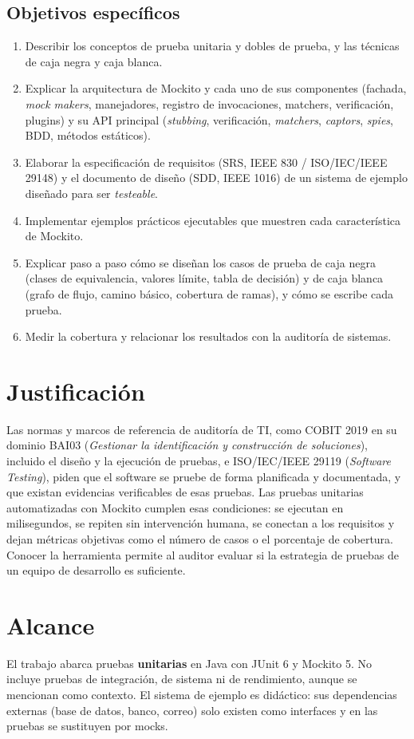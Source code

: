 \documentclass[11pt,a4paper,oneside]{report}
\begin{document}
\subsection{Objetivos específicos}
\begin{enumerate}
  \item Describir los conceptos de prueba unitaria y dobles de prueba, y las técnicas de caja negra y caja blanca.
  \item Explicar la arquitectura de Mockito y cada uno de sus componentes (fachada, \emph{mock makers}, manejadores, registro de invocaciones, matchers, verificación, plugins) y su API principal (\emph{stubbing}, verificación, \emph{matchers}, \emph{captors}, \emph{spies}, BDD, métodos estáticos).
  \item Elaborar la especificación de requisitos (SRS, IEEE 830 / ISO/IEC/IEEE 29148) y el documento de diseño (SDD, IEEE 1016) de un sistema de ejemplo diseñado para ser \emph{testeable}.
  \item Implementar ejemplos prácticos ejecutables que muestren cada característica de Mockito.
  \item Explicar paso a paso cómo se diseñan los casos de prueba de caja negra (clases de equivalencia, valores límite, tabla de decisión) y de caja blanca (grafo de flujo, camino básico, cobertura de ramas), y cómo se escribe cada prueba.
  \item Medir la cobertura y relacionar los resultados con la auditoría de sistemas.
\end{enumerate}

\section{Justificación}
Las normas y marcos de referencia de auditoría de TI, como COBIT 2019 en su dominio BAI03 (\emph{Gestionar la identificación y construcción de soluciones}), incluido el diseño y la ejecución de pruebas, e ISO/IEC/IEEE 29119 (\emph{Software Testing}), piden que el software se pruebe de forma planificada y documentada, y que existan evidencias verificables de esas pruebas. Las pruebas unitarias automatizadas con Mockito cumplen esas condiciones: se ejecutan en milisegundos, se repiten sin intervención humana, se conectan a los requisitos y dejan métricas objetivas como el número de casos o el porcentaje de cobertura. Conocer la herramienta permite al auditor evaluar si la estrategia de pruebas de un equipo de desarrollo es suficiente.

\section{Alcance}
El trabajo abarca pruebas \textbf{unitarias} en Java con JUnit 6 y Mockito 5. No incluye pruebas de integración, de sistema ni de rendimiento, aunque se mencionan como contexto. El sistema de ejemplo es didáctico: sus dependencias externas (base de datos, banco, correo) solo existen como interfaces y en las pruebas se sustituyen por mocks.
\end{document}
